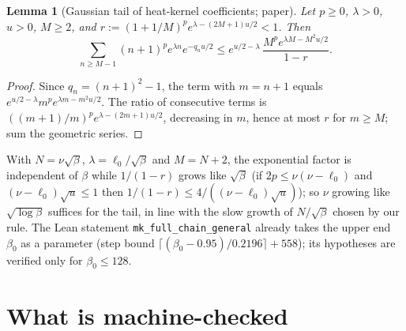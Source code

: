 \documentclass[11pt,a4paper]{article}
\newtheorem{lemma}[theorem]{Lemma}
\theoremstyle{definition}
\theoremstyle{remark}
\newcommand{\code}[1]{\texttt{#1}}
\begin{document}
\begin{lemma}[Gaussian tail of heat-kernel coefficients; paper]\label{lem:tail}
Let $p\ge0$, $\lambda>0$, $u>0$, $M\ge2$, and $r:=(1+1/M)^pe^{\lambda-(2M+1)u/2}<1$. Then
\[
\sum_{n\ge M-1}(n+1)^pe^{\lambda n}e^{-q_nu/2}\le e^{u/2-\lambda}\,\frac{M^pe^{\lambda M-M^2u/2}}{1-r}.
\]
\end{lemma}
\begin{proof}
Since $q_n=(n+1)^2-1$, the term with $m=n+1$ equals $e^{u/2-\lambda}m^pe^{\lambda m-m^2u/2}$.
The ratio of consecutive terms is $((m+1)/m)^pe^{\lambda-(2m+1)u/2}$, decreasing in $m$, hence at most $r$ for $m\ge M$; sum the geometric series.
\end{proof}
With $N=\nu\sqrt\beta$, $\lambda=\ell_0/\sqrt\beta$ and $M=N+2$, the exponential factor is independent of $\beta$ while $1/(1-r)$ grows like $\sqrt\beta$ (if $2p\le\nu(\nu-\ell_0)$ and $(\nu-\ell_0)\sqrt u\le1$ then $1/(1-r)\le4/((\nu-\ell_0)\sqrt u)$); so $\nu$ growing like $\sqrt{\log\beta}$ suffices for the tail, in line with the slow growth of $N/\sqrt\beta$ chosen by our rule.
The Lean statement \code{mk\_full\_chain\_general} already takes the upper end $\beta_0$ as a parameter (step bound $\lceil(\beta_0-0.95)/0.2196\rceil+558$); its hypotheses are verified only for $\beta_0\le128$.

\section{What is machine-checked}\label{sec:lean}
\end{document}
